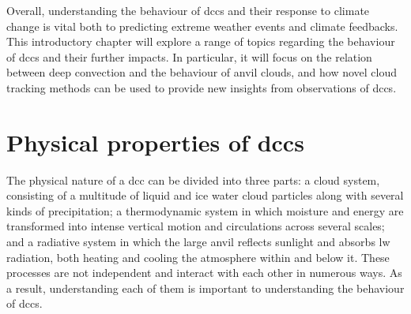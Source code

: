 Overall, understanding the behaviour of \acrshort{dcc}s and their response to climate change is vital both to predicting extreme weather events and climate feedbacks.
This introductory chapter will explore a range of topics regarding the behaviour of \acrshort{dcc}s and their further impacts.
In particular, it will focus on the relation between deep convection and the behaviour of anvil clouds, and how novel cloud tracking methods can be used to provide new insights from observations of \acrshort{dcc}s.


\section{Physical properties of \acrshort{dcc}s}

The physical nature of a \acrshort{dcc} can be divided into three parts: a cloud system, consisting of a multitude of liquid and ice water cloud particles along with several kinds of precipitation; a thermodynamic system in which moisture and energy are transformed into intense vertical motion and circulations across several scales; and a radiative system in which the large anvil reflects sunlight and absorbs \acrshort{lw} radiation, both heating and cooling the atmosphere within and below it.
These processes are not independent and interact with each other in numerous ways.
As a result, understanding each of them is important to understanding the behaviour of \acrshort{dcc}s.

